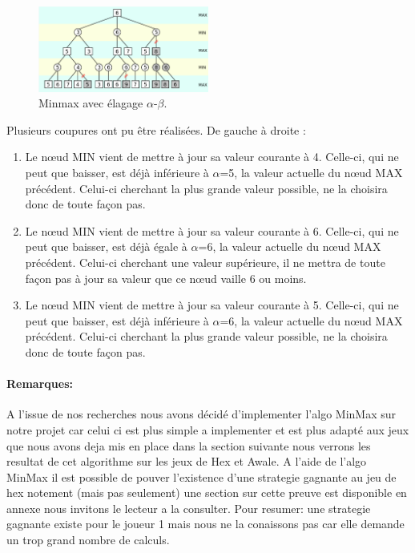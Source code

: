 \begin{figure}[h]
    \begin{center}
        \includegraphics[width=0.5\textwidth]{root/minmax_alpha_beta.png}
    \end{center}
    \caption{Minmax avec élagage $\alpha$-$\beta$.}\label{fig:min_max_alpha_beta}
\end{figure}


Plusieurs coupures ont pu être réalisées. De gauche à droite :
\begin{enumerate}
    \item Le nœud MIN vient de mettre à jour sa valeur courante à 4. Celle-ci, qui ne peut que baisser, est déjà inférieure à $\alpha$=5, 
    la valeur actuelle du nœud MAX précédent. Celui-ci cherchant la plus grande valeur possible, ne la choisira donc de toute façon pas.
    \item Le nœud MIN vient de mettre à jour sa valeur courante à 6. Celle-ci, qui ne peut que baisser, est déjà égale à $\alpha$=6, la valeur 
    actuelle du nœud MAX précédent. Celui-ci cherchant une valeur supérieure, il ne mettra de toute façon pas à jour sa valeur que ce nœud 
    vaille 6 ou moins.
    \item Le nœud MIN vient de mettre à jour sa valeur courante à 5. Celle-ci, qui ne peut que baisser, est déjà inférieure à $\alpha$=6, la valeur 
    actuelle du nœud MAX précédent. Celui-ci cherchant la plus grande valeur possible, ne la choisira donc de toute façon pas.
\end{enumerate}

\paragraph{Remarques:}
A l'issue de nos recherches nous avons décidé d'implementer l'algo MinMax sur notre projet car celui ci est plus simple
a implementer et est plus adapté aux jeux que nous avons deja mis en place dans la section suivante nous verrons les resultat
de cet algorithme sur les jeux de Hex et Awale.
A l'aide de l'algo MinMax il est possible de pouver l'existence d'une strategie gagnante au jeu de hex notement (mais pas seulement)
une section sur cette preuve est disponible en annexe nous invitons le lecteur a la consulter.
Pour resumer: une strategie gagnante existe pour le joueur 1 mais nous ne la conaissons pas car elle demande un trop grand nombre
de calculs.